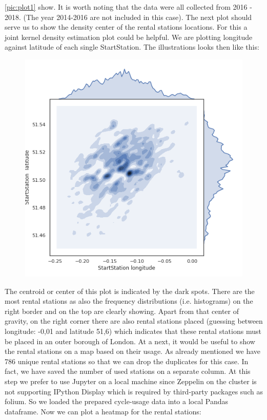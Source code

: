 \ref{pic:plot1} show. It is worth noting that the data were all collected from 2016 - 2018. (The year 2014-2016 are not included in this case). 
The next plot should serve us to show the density center of the rental stations locations. For this a joint
kernel density estimation plot could be helpful. We are plotting longitude against latitude of each single
StartStation. The illustrations looks then like this:
\begin{figure}[H]
\hspace{-0.8cm}
\includegraphics[width=1.1\textwidth]{img/plot2}\label{pic:plot2}
\label{pic:plot2}
\end{figure}
\noindent 
The centroid or center of this plot is indicated by the dark spots. There are the most rental stations as also the frequency distributions (i.e. histograms) on the right border and on the top are clearly showing. Apart from that center of gravity, on the right corner there are also rental stations placed (guessing between longitude: -0,01 and latitude 51,6) which indicates that these rental stations must be placed in an outer borough of London. At a next, it would be useful to show the rental stations on a map based on their usage. As already mentioned we have 786 unique rental stations so that we can drop the duplicates for this case. In fact, we have saved the number of used stations on a separate column. At this step we prefer to use Jupyter on a local machine since Zeppelin on the cluster is not supporting IPython Display which is required by third-party packages such as folium. So we loaded the prepared cycle-usage data into a local Pandas dataframe. Now we can plot a heatmap for the rental stations:
